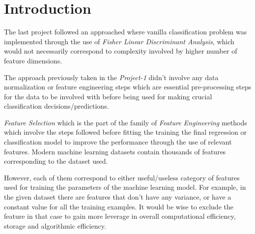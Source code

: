 \documentclass[12pt,twoside,a4paper]{article}
\title{\mytitle}
\author{\myauthors}
\date{\mydate}
\begin{document}
\maketitle

\begin{abstract}

This project primarily deals with feature subset selection for the classification problem through the use of the Taiji sequence dataset. The use of feature selection is to solve the issues of 'Curse of Dimensionality', computational efficiency, easier data collection, storage size, and interpretability through the strategy of dimensionality reduction. Implementations of the feature selection algorithms in this project include \textbf{Filtering} and \textbf{Wrapper} methods. 

\end{abstract}
\vspace{1ex}

\tableofcontents
\pagebreak
\section{Introduction}
The last project followed an approached where vanilla classification problem was implemented through the use of \textit{Fisher Linear Discriminant Analysis}, which would not necessarily correspond to complexity involved by higher number of feature dimensions. 

The approach previously taken in the \textit{Project-1} didn't involve any data normalization or feature engineering steps which are essential pre-processing steps for the data to be involved with before being used for making crucial classification decisions/predictions.

\textit{Feature Selection} which is the part of the family of \textit{Feature Engineering} methods which involve the steps followed before fitting the training the final regression or classification model to improve the performance through the use of relevant features. Modern machine learning datasets contain thousands of features corresponding to the dataset used. 

However, each of them correspond to either useful/useless category of features used for training the parameters of the machine learning model. For example, in the given dataset there are features that don't have any variance, or have a constant value for all the training examples. It would be wise to exclude the feature in that case to gain more leverage in overall computational efficiency, storage and algorithmic efficiency.
\end{document}
